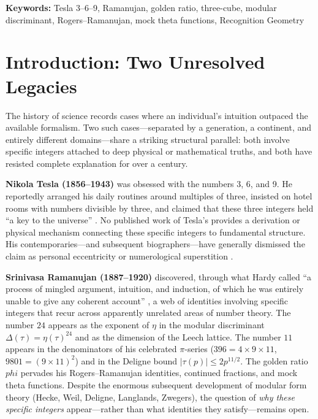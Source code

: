 \documentclass[11pt]{article}
\def\phig{phi}
\theoremstyle{plain}
\theoremstyle{definition}
\theoremstyle{remark}
\newcommand{\phig}{\varphi}
\begin{document}
\noindent\textbf{Keywords:} Tesla 3--6--9, Ramanujan, golden ratio, three-cube, modular discriminant, Rogers--Ramanujan, mock theta functions, Recognition Geometry

\tableofcontents

\section{Introduction: Two Unresolved Legacies}
\label{sec:intro}

The history of science records cases where an individual's intuition outpaced the available formalism.
Two such cases---separated by a generation, a continent, and entirely different domains---share a striking structural parallel: both involve specific integers attached to deep physical or mathematical truths, and both have resisted complete explanation for over a century.

\textbf{Nikola Tesla (1856--1943)} was obsessed with the numbers 3, 6, and 9.
He reportedly arranged his daily routines around multiples of three, insisted on hotel rooms with numbers divisible by three, and claimed that these three integers held ``a key to the universe'' \cite{Carlson2013}.
No published work of Tesla's provides a derivation or physical mechanism connecting these specific integers to fundamental structure.
His contemporaries---and subsequent biographers---have generally dismissed the claim as personal eccentricity or numerological superstition \cite{Cheney2001}.

\textbf{Srinivasa Ramanujan (1887--1920)} discovered, through what Hardy called ``a process of mingled argument, intuition, and induction, of which he was entirely unable to give any coherent account'' \cite{Hardy1940}, a web of identities involving specific integers that recur across apparently unrelated areas of number theory.
The number $24$ appears as the exponent of $\eta$ in the modular discriminant $\Delta(\tau) = \eta(\tau)^{24}$ and as the dimension of the Leech lattice.
The number $11$ appears in the denominators of his celebrated $\pi$-series ($396 = 4 \times 9 \times 11$, $9801 = (9 \times 11)^2$) and in the Deligne bound $|\tau(p)| \le 2p^{11/2}$.
The golden ratio $\phig$ pervades his Rogers--Ramanujan identities, continued fractions, and mock theta functions.
Despite the enormous subsequent development of modular form theory (Hecke, Weil, Deligne, Langlands, Zwegers), the question of \emph{why these specific integers} appear---rather than what identities they satisfy---remains open.
\end{document}
